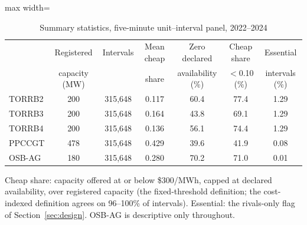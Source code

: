 \begin{table}[!htbp]\centering
\caption{Summary statistics, five-minute unit--interval panel, 2022--2024}
\label{tab:sumstats}
\begin{adjustbox}{max width=\textwidth}
\begin{threeparttable}
\begin{tabular}{lcccccc}
\toprule
 & Registered & Intervals & Mean cheap & Zero declared & Cheap share & Essential \\
 & capacity (MW) & & share & availability (\%) & $<$0.10 (\%) & intervals (\%) \\
\midrule
TORRB2 & 200 & 315,648 & 0.117 & 60.4 & 77.4 & 1.29 \\
TORRB3 & 200 & 315,648 & 0.164 & 43.8 & 69.1 & 1.29 \\
TORRB4 & 200 & 315,648 & 0.136 & 56.1 & 74.4 & 1.29 \\
PPCCGT & 478 & 315,648 & 0.429 & 39.6 & 41.9 & 0.08 \\
OSB-AG & 180 & 315,648 & 0.280 & 70.2 & 71.0 & 0.01 \\
\bottomrule
\end{tabular}
\begin{tablenotes}\footnotesize
\item Cheap share: capacity offered at or below \$300/MWh, capped at declared availability, over registered capacity (the fixed-threshold definition; the cost-indexed definition agrees on 96--100\% of intervals). Essential: the rivals-only flag of Section~\ref{sec:design}. OSB-AG is descriptive only throughout.
\end{tablenotes}
\end{threeparttable}
\end{adjustbox}
\end{table}
